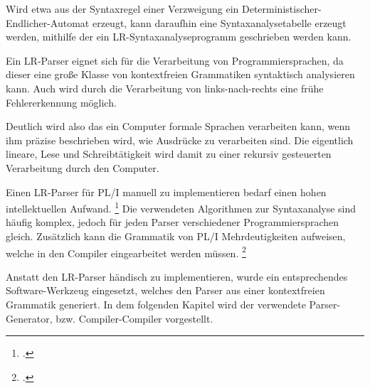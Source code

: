 Wird etwa aus der Syntaxregel einer Verzweigung ein Deterministischer-Endlicher-Automat erzeugt, kann
daraufhin eine Syntaxanalysetabelle erzeugt werden, mithilfe
der ein LR-Syntaxanalyseprogramm geschrieben werden kann.

Ein LR-Parser eignet sich für die Verarbeitung von Programmiersprachen, da dieser eine große Klasse von kontextfreien Grammatiken syntaktisch analysieren kann.
Auch wird durch die Verarbeitung von links-nach-rechts eine frühe Fehlererkennung möglich.

Deutlich wird also das ein Computer formale Sprachen verarbeiten kann, wenn ihm präzise beschrieben wird, wie Ausdrücke zu verarbeiten sind. 
Die eigentlich lineare, Lese und Schreibtätigkeit wird damit zu einer rekursiv gesteuerten Verarbeitung durch den Computer.

Einen LR-Parser für PL/I manuell zu implementieren bedarf einen hohen intellektuellen Aufwand. \footcite[Vgl. ][S. 27ff. ]{compibau}
Die verwendeten Algorithmen zur Syntaxanalyse sind häufig komplex, jedoch für jeden Parser verschiedener Programmiersprachen gleich. 
Zusätzlich kann die Grammatik von PL/I Mehrdeutigkeiten aufweisen, welche in den Compiler eingearbeitet werden müssen.
\footcite[Vgl. ][S. 262ff. ]{compibau}

Anstatt den LR-Parser händisch zu implementieren, wurde ein entsprechendes Software-Werkzeug eingesetzt, welches den Parser aus einer kontextfreien Grammatik generiert.
In dem folgenden Kapitel wird der verwendete Parser-Generator, bzw. Compiler-Compiler vorgestellt.




     
